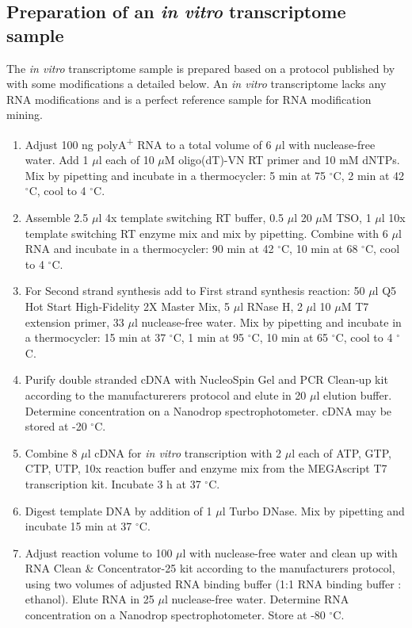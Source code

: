 \documentclass[times, 11pt, a4paper]{article}
\begin{document}
\subsection*{Preparation of an \emph{in vitro} transcriptome sample}
The \emph{in vitro} transcriptome sample is prepared based on a protocol published by \cite{zhang2021systematic} with some modifications a detailed below.
An \emph{in vitro} transcriptome lacks any RNA modifications and is a perfect reference sample for RNA modification mining.

\begin{enumerate}
\item Adjust 100 ng polyA\textsuperscript{+} RNA to a total volume of 6 $\mu$l with nuclease-free water. Add 1 $\mu$l each of 10 $\mu$M oligo(dT)-VN RT primer and 10 mM dNTPs. Mix by pipetting and incubate in a thermocycler: 5 min at 75 $^{\circ}$C, 2 min at 42 $^{\circ}$C, cool to 4 $^{\circ}$C.

\item Assemble 2.5 $\mu$l 4x template switching RT buffer, 0.5 $\mu$l 20 $\mu$M TSO, 1 $\mu$l 10x template switching RT enzyme mix and mix by pipetting. Combine with 6 $\mu$l RNA and incubate in a thermocycler: 90 min at 42 $^{\circ}$C, 10 min at 68 $^{\circ}$C, cool to 4 $^{\circ}$C.

\item For Second strand synthesis add to First strand synthesis reaction: 50 $\mu$l Q5 Hot Start High-Fidelity 2X Master Mix, 5 $\mu$l RNase H, 2 $\mu$l 10 $\mu$M T7 extension primer, 33 $\mu$l nuclease-free water. Mix by pipetting and incubate in a thermocycler: 15 min at 37 $^{\circ}$C, 1 min at 95 $^{\circ}$C, 10 min at 65 $^{\circ}$C, cool to 4 $^{\circ}$C.

\item Purify double stranded cDNA with NucleoSpin Gel and PCR Clean‑up kit according to the manufacturerers protocol and elute in 20 $\mu$l elution buffer. Determine concentration on a Nanodrop spectrophotometer. cDNA may be stored at -20 $^{\circ}$C.

\item Combine 8 $\mu$l cDNA for \emph{in vitro} transcription with 2 $\mu$l each of ATP, GTP, CTP, UTP, 10x reaction buffer and enzyme mix from the MEGAscript T7 transcription kit. Incubate 3 h at 37 $^{\circ}$C.

\item Digest template DNA by addition of 1 $\mu$l Turbo DNase. Mix by pipetting and incubate 15 min at 37 $^{\circ}$C.

\item Adjust reaction volume to 100 $\mu$l with nuclease-free water and clean up with RNA Clean \& Concentrator-25 kit according to the manufacturers protocol, using two volumes of adjusted RNA binding buffer (1:1 RNA binding buffer : ethanol). Elute RNA in 25 $\mu$l nuclease-free water. Determine RNA concentration on a Nanodrop spectrophotometer. Store at -80 $^{\circ}$C.

\end{enumerate}
\end{document}
